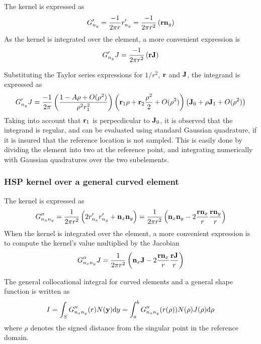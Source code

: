 The kernel is expressed as
%
\begin{equation}
	G'_{n_y} = \frac{-1}{2\pi r} r'_{n_y}
	= \frac{-1}{2\pi r^2} \left( {\bf r} {\bf n}_y \right)
\end{equation}
%
As the kernel is integrated over the element, a more convenient expression is
%
\begin{equation}
	G'_{n_y} J = \frac{-1}{2\pi r^2} \left( {\bf r} {\bf J} \right)
\end{equation}

Substituting the Taylor series expressions for $1/r^2$, ${\bf r}$ and ${\bf J}$, the integrand is expressed as
%
\begin{equation}
	G'_{n_y} J = \frac{-1}{2\pi} \left(\frac{1-A\rho + O(\rho^2)}{\rho^2 r_1^2}\right) 
	\left( {\bf r}_1 \rho + {\bf r}_2 \frac{\rho^2}{2} + O(\rho^3) \right) 
	\left( {\bf J}_0 + \rho {\bf J}_1 + O(\rho^2) \right)
\end{equation}
%
Taking into account that ${\bf r}_1$ is perpecdicular to ${\bf J}_0$, it is observed that the integrand is regular, and can be evaluated using standard Gaussian quadrature, if it is insured that the reference location is not sampled.
This is easily done by dividing the element into two at the reference point, and integrating numerically with Gaussian quadratures over the two subelements.



\subsubsection{HSP kernel over a general curved element}

The kernel is expressed as
%
\begin{equation}
	G''_{n_x n_y} = \frac{1}{2\pi r^2} \left( 2 r'_{n_x} r'_{n_y} + {\bf n}_x {\bf n}_y \right)
	= \frac{1}{2\pi r^2} \left( {\bf n}_x {\bf n}_y - 2 \frac{{\bf r} {\bf n}_x}{r} \frac{{\bf r}{\bf n}_y}{r} \right)
\end{equation}
%
When the kernel is integrated over the element, a more convenient expression is to compute the kernel's value multiplied by the Jacobian
%
\begin{equation}
	G''_{n_x n_y} J = 
	\frac{1}{2\pi r^2} \left( {\bf n}_x {\bf J} - 2 \frac{{\bf r} {\bf n}_x}{r} \frac{{\bf r}{\bf J}}{r} \right)
\end{equation}

The general collocational integral for curved elements and a general shape function is written as
%
\begin{align}
	I = \int_S G''_{n_x n_y}(r) N({\bf y}) \mathrm{d} y
	= \int_a^b G''_{n_x n_y}(r(\rho)) N(\rho) J(\rho) \mathrm{d} \rho
\end{align}
%
where $\rho$ denotes the signed distance from the singular point in the reference domain.

